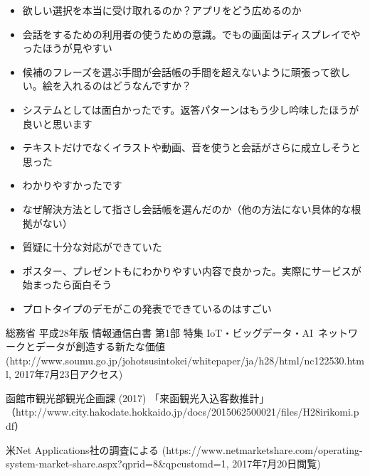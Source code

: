 \documentclass[11pt,papersize]{jsbook}
\begin{document}
\begin{appendix}
\begin{itemize}
 \item 欲しい選択を本当に受け取れるのか？アプリをどう広めるのか
 \item 会話をするための利用者の使うための意識。でもの画面はディスプレイでやったほうが見やすい
 \item 候補のフレーズを選ぶ手間が会話帳の手間を超えないように頑張って欲しい。絵を入れるのはどうなんですか？
 \item システムとしては面白かったです。返答パターンはもう少し吟味したほうが良いと思います
 \item テキストだけでなくイラストや動画、音を使うと会話がさらに成立しそうと思った
 \item わかりやすかったです
 \item なぜ解決方法として指さし会話帳を選んだのか（他の方法にない具体的な根拠がない）
 \item 質疑に十分な対応ができていた
 \item ポスター、プレゼントもにわかりやすい内容で良かった。実際にサービスが始まったら面白そう
 \item プロトタイプのデモがこの発表でできているのはすごい

\end{itemize}
\end{appendix}



\begin{thebibliography}{9}
総務省 平成28年版 情報通信白書 第1部 特集 IoT・ビッグデータ・AI~ネットワークとデータが創造する新たな価値~
 (http://www.soumu.go.jp/johotsusintokei/whitepaper/ja/h28/html/nc122530.html, 2017年7月23日アクセス)

函館市観光部観光企画課 (2017) 「来函観光入込客数推計」
（http://www.city.hakodate.hokkaido.jp/docs/2015062500021/files/H28irikomi.pdf）

米Net Applications社の調査による
(https://www.netmarketshare.com/operating-system-market-share.aspx?qprid=8\&qpcustomd=1, 2017年7月20日閲覧)
\end{thebibliography}
\end{document}
